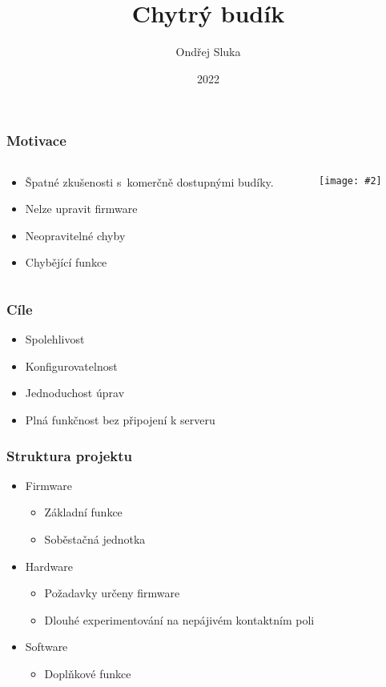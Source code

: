 \documentclass[
    utf8,
    aspectratio=169,
    17pt,  %
]{beamer}
\title{Chytrý budík}
\author{Ondřej Sluka}
\date{2022}
\newcommand{\fullsizegraphics}[2][]{%
    \centering%
    \texttt{[image: \#2]}%
}
\begin{document}
\frame{\titlepage}

\begin{frame}
    \frametitle{Motivace}
    \begin{columns}
        \begin{column}{0.5\textwidth}
            \begin{itemize}
                \item Špatné zkušenosti s~komerčně dostupnými budíky.
                \item Nelze upravit firmware
                \item Neopravitelné chyby
                \item Chybějící funkce
            \end{itemize}
        \end{column}
        \begin{column}{0.5\textwidth}
            \fullsizegraphics{sencor-SRC-330-GN}
        \end{column}
    \end{columns}
\end{frame}

\begin{frame}
    \frametitle{Cíle}
    \begin{itemize}
        \item \alert{Spolehlivost}
        \item Konfigurovatelnost
        \item Jednoduchost úprav%
        \item Plná funkčnost bez připojení k serveru
    \end{itemize}
\end{frame}

\begin{frame}
    \frametitle{Struktura projektu}
    \begin{itemize}
        \item Firmware
            \begin{itemize}
                \item Základní funkce
                \item Soběstačná jednotka
            \end{itemize}
        \item Hardware
            \begin{itemize}
                \item Požadavky určeny firmware
                \item Dlouhé experimentování na nepájivém kontaktním poli
            \end{itemize}
        \item Software
            \begin{itemize}
                \item Doplňkové funkce
            \end{itemize}
    \end{itemize}
\end{frame}
\end{document}
